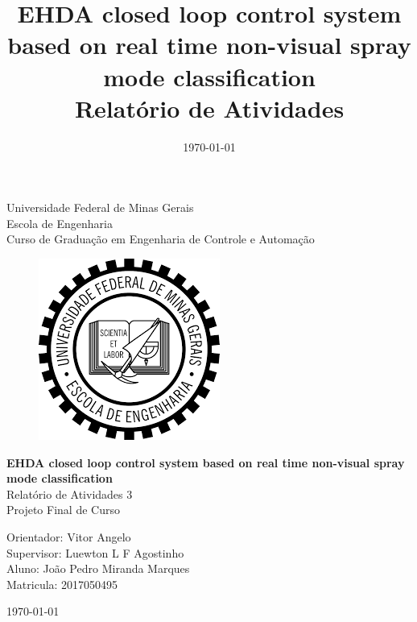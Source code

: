 \begin{titlepage}
    \begin{center}
           
    {\large Universidade Federal de Minas Gerais\\
    Escola de Engenharia \\
    Curso de Graduação em Engenharia de Controle e Automação\\}
    \vfill

    \begin{figure}[h]
        \centering
        \includegraphics[scale=0.5]{images/brasao_ufmg.png}
    \end{figure}
    \vspace{2cm}


    {\bf\Large EHDA closed loop control system based on real time non-visual spray mode classification\\}
    \vspace{1cm} 
    {\Large Relatório de Atividades 3   \\  Projeto Final de Curso}
    \vspace{2cm}  
    
    {\large Orientador: Vitor Angelo\\
            Supervisor: Luewton L F Agostinho}\\

    
    {\large Aluno: João Pedro Miranda Marques \\
    Matricula: 2017050495}
    \vspace{2cm}  

    \today
    \vspace{2cm}  
       

    \large \date{\today}
    \end{center}
    
    \end{titlepage}
    
    \newpage
    \clearpage
    \thispagestyle{empty}
    
    \cleardoublepage


\title{
    EHDA closed loop control system based on real time non-visual spray mode classification \\
    \large Relatório de Atividades}

